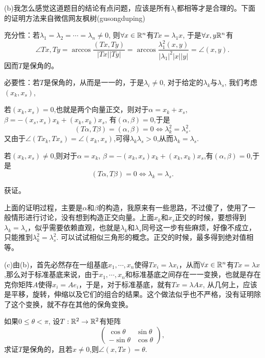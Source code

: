 \begin{problemset}
(b)我怎么感觉这道题目的结论有点问题，应该是所有$\lambda_i$都相等才是合理的。下面的证明方法来自微信网友枫树(gusongduping)

充分性：若$\lambda_1 = \lambda_2 = \cdots = \lambda_n \neq 0$, 则$\forall x \in \mathbb{R}^n$有$Tx = \lambda_1x$, 于是$\forall x, y \mathbb{R}^n$有
\[
\angle{Tx, Ty} = \arccos{\frac{(Tx, Ty)}{|Tx||Ty|}} = \arccos{\frac{\lambda_1^2(x, y)}{|\lambda_1|^2|x||y|}} = \angle(x,y).
\]
因而$T$是保角的。

必要性：若$T$是保角的，从而是一一的，于是$\lambda_i \neq 0$, 对于给定的$\lambda_k$与$\lambda_s$, 我们考虑$(x_k, x_s)$,

若$(x_k,x_s) = 0$,也就是两个向量正交，则对于$\alpha = x_k + x_s$, $\beta = -(x_s,x_s)x_k + (x_k,x_k)x_s$, 有$(\alpha, \beta) = 0$,于是
\[
(T\alpha, T\beta) = (\alpha, \beta) = 0 \Leftrightarrow \lambda_k^2 = \lambda_s^2.
\]
又由于$\angle(Tx_k, Tx_s) = \angle(x_k, x_s)$,可得$\lambda_k\lambda_s > 0$,从而$\lambda_k = \lambda_s$.

若$(x_k, x_s) \neq 0$,则对于$\alpha = x_k$, $\beta = -(x_k, x_s)x_k + (x_k, x_k)x_s$,有$(\alpha, \beta) = 0$,于是
\[
(T\alpha, T\beta) = 0 \Leftrightarrow \lambda_k = \lambda_s.
\]

获证。

上面的证明过程，主要是$\alpha$和$\beta$的构造，我原来有一些思路，不过傻了，使用了一般情形进行讨论，没有想到构造正交向量。上面$x_k$和$x_s$正交的时候，要想得到$\lambda_k=\lambda_s$，似乎需要依赖直观，也就是$\lambda_k$和$\lambda_s$同号这一步有些麻烦，好像不成立，只能推到$\lambda_k^2 = \lambda_s^2$. 可以试试相似三角形的概念。正交的时候，最多得到绝对值相等。

(c)由(b)，首先必然存在一组基底$x_1,\cdots, x_n$使得$Tx_i = \lambda{x_i}$，从而$\forall x \in \mathbb{R}^n$有$Tx = \lambda{x}$,那么对于标准基底来说，由于$x_1,\cdots, x_n$和标准基底之间存在一一变换，也就是存在克你矩阵$A$使得$x_i = Ae_i$，于是，对于标准基底，就有$Tx = \lambda{Ax}$, 从几何上，应该是平移，旋转，伸缩以及它们的组合的结果。这个做法似乎也不严格，没有证明除了这个变换，就不存在其他的保角变换。

\item 如果$0 \le \theta < \pi$, 设$T: \mathbb{R}^2 \to \mathbb{R}^2$有矩阵
\[
\begin{pmatrix}
\cos{\theta} & \sin{\theta}\\
-\sin{\theta} & \cos{\theta}
\end{pmatrix},
\]
求证$T$是保角的，且若$x \neq 0$,则$\angle(x, Tx) = \theta$.


\end{problemset}
